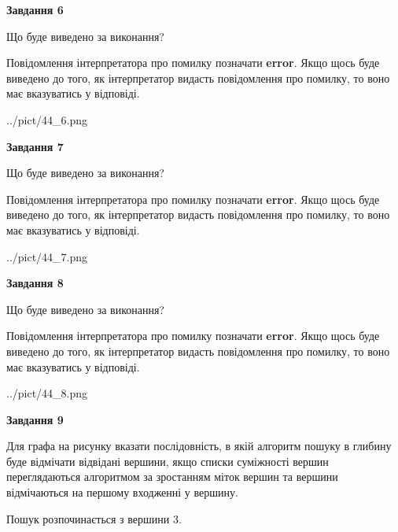 \documentclass[12pt, ukrainian]{article}
\begin{document}
{\begin {large}
{\begin {center}\textbf{Завдання 6}\end {center}}\par
Що буде виведено за виконання?

Повідомлення інтерпретатора про помилку позначати \textbf{error}.
Якщо щось буде виведено до того, як інтерпретатор видасть повідомлення про помилку, 
то воно має вказуватись у відповіді. \par


\begin{center}
	{../pict/44_6.png}
\end{center}
\newpage

{\begin {center}\textbf{Завдання 7}\end {center}}\par
Що буде виведено за виконання?

Повідомлення інтерпретатора про помилку позначати \textbf{error}.
Якщо щось буде виведено до того, як інтерпретатор видасть повідомлення про помилку, 
то воно має вказуватись у відповіді. \par


\begin{center}
	{../pict/44_7.png}
\end{center}
\newpage

{\begin {center}\textbf{Завдання 8}\end {center}}\par
Що буде виведено за виконання?

Повідомлення інтерпретатора про помилку позначати \textbf{error}.
Якщо щось буде виведено до того, як інтерпретатор видасть повідомлення про помилку, 
то воно має вказуватись у відповіді. \par


\begin{center}
	{../pict/44_8.png}
\end{center}
\newpage

{\begin {center}\textbf{Завдання 9}\end {center}}\par
Для графа на рисунку вказати послідовність, в якій алгоритм пошуку в глибину буде відмічати відвідані вершини, якщо списки суміжності вершин переглядаються алгоритмом за зростанням міток вершин та вершини відмічаються на першому вход\-женні у вершину.\par
Пошук розпочинається з вершини 3.\par


\end{large}}
\end{document}

